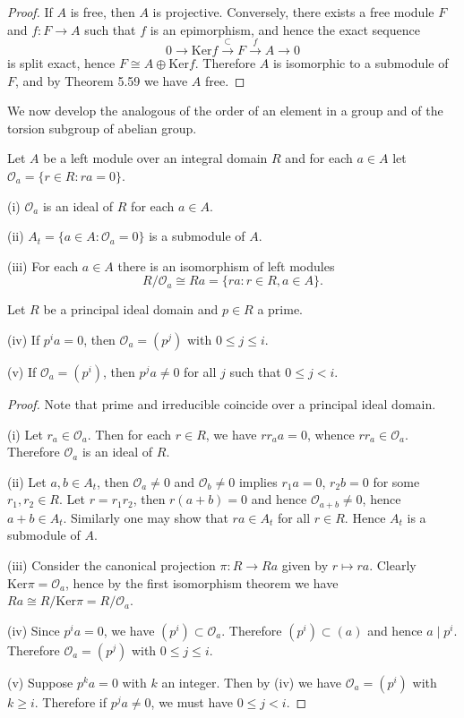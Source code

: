 \begin{proof}
If $A$ is free, then $A$ is projective. Conversely, there exists a free module $F$ and $f:F\to A$ such that $f$ is an epimorphism, and hence the exact sequence 
$$
0\longrightarrow \mathrm{Ker}f\overset{\subset}{\longrightarrow}F\overset{f}{\longrightarrow}A\longrightarrow 0
$$
is split exact, hence $F\cong A\oplus\mathrm{Ker}f$. Therefore $A$ is isomorphic to a submodule of $F$, and by Theorem 5.59 we have $A$ free.
\end{proof}
We now develop the analogous of the order of an element in a group and of the torsion subgroup of abelian group.
\begin{theorem}
Let $A$ be a left module over an integral domain $R$ and for each $a\in A$ let $\mathcal{O}_a=\{r\in R:ra=0\}$.\par
(i) $\mathcal{O}_a$ is an ideal of $R$ for each $a\in A$.\par
(ii) $A_t=\{a\in A:\mathcal{O}_a=0\}$ is a submodule of $A$.\par
(iii) For each $a\in A$ there is an isomorphism of left modules 
$$R/\mathcal{O}_a\cong Ra=\{ra:r\in R,a\in A\}.$$\par
Let $R$ be a principal ideal domain and $p\in R$ a prime.\par
(iv) If $p^ia=0$, then $\mathcal{O}_a=(p^j)$ with $0\le j\le i$.\par
(v) If $\mathcal{O}_a=(p^i)$, then $p^ja\ne 0$ for all $j$ such that $0\le j<i$.
\end{theorem}
\begin{proof}
Note that prime and irreducible coincide over a principal ideal domain.\par
(i) Let $r_a\in\mathcal{O}_a$. Then for each $r\in R$, we have $rr_aa=0$, whence $rr_a\in\mathcal{O}_a$. Therefore $\mathcal{O}_a$ is an ideal of $R$.\par
(ii) Let $a,b\in A_t$, then $\mathcal{O}_a\ne 0$ and $\mathcal{O}_b\ne 0$ implies $r_1a=0$, $r_2b=0$ for some $r_1,r_2\in R$. Let $r=r_1r_2$, then $r(a+b)=0$ and hence $\mathcal{O}_{a+b}\ne 0$, hence $a+b\in A_t$. Similarly one may show that $ra\in A_t$ for all $r\in R$. Hence $A_t$ is a submodule of $A$.\par
(iii) Consider the canonical projection $\pi:R\to Ra$ given by $r\mapsto ra$. Clearly $\mathrm{Ker}\pi=\mathcal{O}_a$, hence by the first isomorphism theorem we have $Ra\cong R/\mathrm{Ker}\pi=R/\mathcal{O}_a$.\par
(iv) Since $p^ia=0$, we have $(p^i)\subset\mathcal{O}_a$. Therefore $(p^i)\subset (a)$ and hence $a\mid p^i$. Therefore $\mathcal{O}_a=(p^j)$ with $0\le j\le i$.\par
(v) Suppose $p^ka=0$ with $k$ an integer. Then by (iv) we have $\mathcal{O}_a=(p^i)$ with $k\ge i$. Therefore if $p^ja\ne 0$, we must have $0\le j<i$.
\end{proof}
